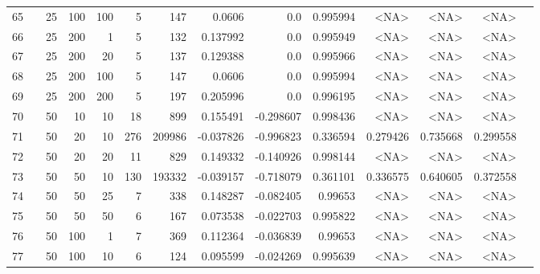 \begin{longtable}{llrrrrrrrrrrrr}
		65  & &           25 &               100 &          100 &           5 &        147 &    0.0606 &       0.0 &  0.995994 &        <NA> &           <NA> &      <NA> \\
		66  & &           25 &               200 &            1 &           5 &        132 &  0.137992 &       0.0 &  0.995949 &        <NA> &           <NA> &      <NA> \\
		67  & &           25 &               200 &           20 &           5 &        137 &  0.129388 &       0.0 &  0.995966 &        <NA> &           <NA> &      <NA> \\
		68  & &           25 &               200 &          100 &           5 &        147 &    0.0606 &       0.0 &  0.995994 &        <NA> &           <NA> &      <NA> \\
		69  & &           25 &               200 &          200 &           5 &        197 &  0.205996 &       0.0 &  0.996195 &        <NA> &           <NA> &      <NA> \\
		70  & &           50 &                10 &           10 &          18 &        899 &  0.155491 & -0.298607 &  0.998436 &        <NA> &           <NA> &      <NA> \\
		71  & &           50 &                20 &           10 &         276 &     209986 & -0.037826 & -0.996823 &  0.336594 &    0.279426 &       0.735668 &  0.299558 \\
		72  & &           50 &                20 &           20 &          11 &        829 &  0.149332 & -0.140926 &  0.998144 &        <NA> &           <NA> &      <NA> \\
		73  & &           50 &                50 &           10 &         130 &     193332 & -0.039157 & -0.718079 &  0.361101 &    0.336575 &       0.640605 &  0.372558 \\
		74  & &           50 &                50 &           25 &           7 &        338 &  0.148287 & -0.082405 &   0.99653 &        <NA> &           <NA> &      <NA> \\
		75  & &           50 &                50 &           50 &           6 &        167 &  0.073538 & -0.022703 &  0.995822 &        <NA> &           <NA> &      <NA> \\
		76  & &           50 &               100 &            1 &           7 &        369 &  0.112364 & -0.036839 &   0.99653 &        <NA> &           <NA> &      <NA> \\
		77  & &           50 &               100 &           10 &           6 &        124 &  0.095599 & -0.024269 &  0.995639 &        <NA> &           <NA> &      <NA> \\

\end{longtable}
